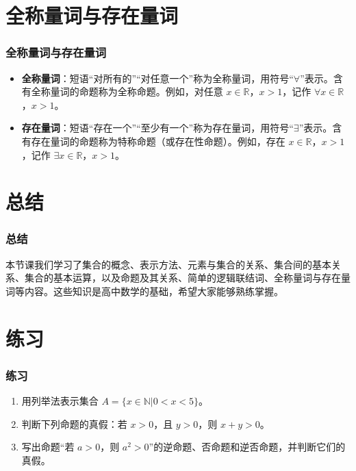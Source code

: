 \documentclass[aspectratio=169]{ctexbeamer} %
\begin{document}
\section{全称量词与存在量词}
\begin{frame}
\frametitle{全称量词与存在量词}
\begin{itemize}
\item \textbf{全称量词}：短语“对所有的”“对任意一个”称为全称量词，用符号“\(\forall\)”表示。含有全称量词的命题称为全称命题。例如，对任意 \(x \in \mathbb{R}\)，\(x > 1\)，记作 \(\forall x \in \mathbb{R}\)，\(x > 1\)。\\

\item \textbf{存在量词}：短语“存在一个”“至少有一个”称为存在量词，用符号“\(\exists\)”表示。含有存在量词的命题称为特称命题（或存在性命题）。例如，存在 \(x \in \mathbb{R}\)，\(x > 1\)，记作 \(\exists x \in \mathbb{R}\)，\(x > 1\)。
\end{itemize}
\end{frame}

\section{总结}

\begin{frame}
\frametitle{总结}
本节课我们学习了集合的概念、表示方法、元素与集合的关系、集合间的基本关系、集合的基本运算，以及命题及其关系、简单的逻辑联结词、全称量词与存在量词等内容。这些知识是高中数学的基础，希望大家能够熟练掌握。
\end{frame}

\section{练习}

\begin{frame}
\frametitle{练习}
\begin{enumerate}[label={\arabic*.}]
\item 用列举法表示集合 \(A = \{x \in \mathbb{N} | 0 < x < 5\}\)。
\item 判断下列命题的真假：若 \(x > 0\)，且 \(y > 0\)，则 \(x + y > 0\)。
\item 写出命题“若 \(a > 0\)，则 \(a^2 > 0\)”的逆命题、否命题和逆否命题，并判断它们的真假。
\end{enumerate}
\end{frame}
\end{document}
